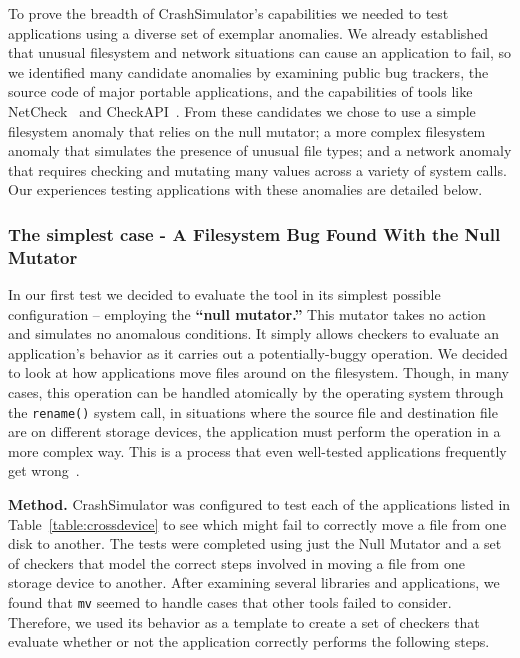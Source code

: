 To prove the breadth of CrashSimulator's capabilities we needed
to test applications
using a diverse set of exemplar anomalies.
We already established
that
unusual filesystem and network situations can cause an application to fail,
so we identified many candidate anomalies
by examining public bug trackers,
the source code of major portable applications, and the capabilities of
tools like NetCheck~\cite{Zhuang_NSDI_2014}
and CheckAPI~\cite{rasley2015detecting}.
From these candidates we
chose to use a simple filesystem anomaly that relies on the null
mutator;
a more complex filesystem anomaly that simulates
the presence of unusual file types;
and a network anomaly that requires
checking and mutating many values across a variety of system calls.
Our experiences testing applications with these anomalies are detailed below.

\subsubsection{The simplest case - A Filesystem Bug Found With the Null Mutator}
\label{sec-move-bugs}
In our first test we decided to evaluate the tool in its simplest possible
configuration -- employing the {\bf ``null mutator.''}
This mutator takes no action and simulates no anomalous conditions.
It simply allows checkers to evaluate an application's behavior
as it carries out a potentially-buggy operation.
We decided to look at how applications
move files around on the filesystem.
Though, in many cases, this operation can be handled
atomically by the operating system
through the {\tt rename()} system call,
in situations where
the source file and destination file are on different storage devices,
the application must perform the operation in a more complex way.
This is a process
that even well-tested applications
frequently get wrong~\cite{PHPRenameBug,PythonShutilBug,NodejsCopyBug}.

{\bf Method.}
CrashSimulator was configured
to test each of the applications listed in Table~\ref{table:crossdevice}
to see which might fail to correctly move a file from one disk to another.
The tests were completed using just the Null Mutator and a set of
checkers that model the correct steps involved in moving a file from one
storage device to another.
After examining several libraries and applications,
we found that
{\tt mv} seemed to handle cases that other tools failed to consider.
Therefore, we
used its behavior as a template to create a set of checkers
that evaluate whether or not
the application correctly performs the following
steps.

